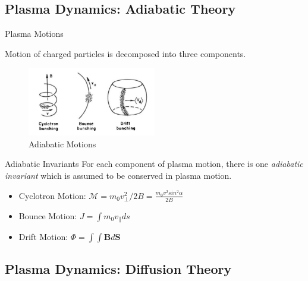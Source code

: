\documentclass{beamer}
\begin{document}
\subsection{Plasma Dynamics:  Adiabatic Theory}

\begin{frame}{Plasma Motions}

  Motion of charged particles is decomposed into three components.
  
   \begin{figure}[h]
        \includegraphics[width=0.5\textwidth]{adiabatic_motions}
        \caption{Adiabatic Motions}
        \label{fig:Adiabatic}
      \end{figure}
\end{frame}

\begin{frame}{Adiabatic Invariants}
  For each component of plasma motion, there is one \emph{adiabatic
    invariant} which is assumed to be conserved in plasma motion.

  \begin{itemize}
  \item<1->{
      Cyclotron Motion: $\mathcal{M} = m_{0} v^{2}_{\perp}/2B =
      \frac{m_{0}v^2 sin^{2}\alpha}{2B}$
    }
  \item<2->{
      Bounce Motion: $J = \int{m_0 v_{\parallel}ds}$
    }
  \item<3->{
      Drift Motion: $\Phi = \int{\int{\mathbf{B} d\mathbf{S}}}$
    }
  \end{itemize}

\end{frame}

\subsection{Plasma Dynamics: Diffusion Theory}

\end{document}
